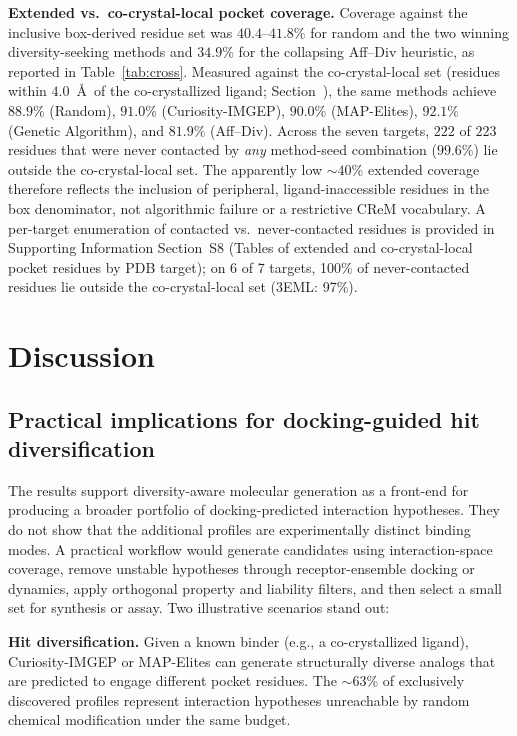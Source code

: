 \documentclass[journal=jcisd8,manuscript=article]{achemso}
\begin{document}
\textbf{Extended vs.\ co-crystal-local pocket coverage.} Coverage against the inclusive box-derived residue set was $40.4$--$41.8\%$ for random and the two winning diversity-seeking methods and $34.9\%$ for the collapsing Aff--Div heuristic, as reported in Table~\ref{tab:cross}. Measured against the co-crystal-local set (residues within $4.0$~\AA\ of the co-crystallized ligand; Section~), the same methods achieve $88.9\%$ (Random), $91.0\%$ (Curiosity-IMGEP), $90.0\%$ (MAP-Elites), $92.1\%$ (Genetic Algorithm), and $81.9\%$ (Aff--Div). Across the seven targets, $222$ of $223$ residues that were never contacted by \emph{any} method-seed combination ($99.6\%$) lie outside the co-crystal-local set. The apparently low $\sim 40\%$ extended coverage therefore reflects the inclusion of peripheral, ligand-inaccessible residues in the box denominator, not algorithmic failure or a restrictive CReM vocabulary. A per-target enumeration of contacted vs.\ never-contacted residues is provided in Supporting Information Section~S8 (Tables of extended and co-crystal-local pocket residues by PDB target); on 6 of 7 targets, 100\% of never-contacted residues lie outside the co-crystal-local set (3EML: 97\%).


\section{Discussion}

\subsection{Practical implications for docking-guided hit diversification}

The results support diversity-aware molecular generation as a front-end for producing a broader portfolio of docking-predicted interaction hypotheses. They do not show that the additional profiles are experimentally distinct binding modes. A practical workflow would generate candidates using interaction-space coverage, remove unstable hypotheses through receptor-ensemble docking or dynamics, apply orthogonal property and liability filters, and then select a small set for synthesis or assay. Two illustrative scenarios stand out:

\textbf{Hit diversification.} Given a known binder (e.g., a co-crystallized ligand), Curiosity-IMGEP or MAP-Elites can generate structurally diverse analogs that are predicted to engage different pocket residues. The $\sim$63\% of exclusively discovered profiles represent interaction hypotheses unreachable by random chemical modification under the same budget.
\end{document}

